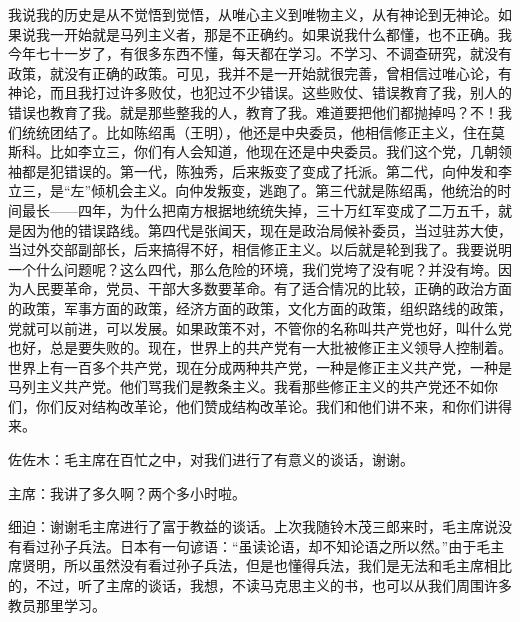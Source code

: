 我说我的历史是从不觉悟到觉悟，从唯心主义到唯物主义，从有神论到无神论。如果说我一开始就是马列主义者，那是不正确约。如果说我什么都懂，也不正确。我今年七十一岁了，有很多东西不懂，每天都在学习。不学习、不调查研究，就没有政策，就没有正确的政策。可见，我并不是一开始就很完善，曾相信过唯心论，有神论，而且我打过许多败仗，也犯过不少错误。这些败仗、错误教育了我，别人的错误也教育了我。就是那些整我的人，教育了我。难道要把他们都抛掉吗？不！我们统统团结了。比如陈绍禹（王明），他还是中央委员，他相信修正主义，住在莫斯科。比如李立三，你们有人会知道，他现在还是中央委员。我们这个党，几朝领袖都是犯错误的。第一代，陈独秀，后来叛变了变成了托派。第二代，向仲发和李立三，是“左”倾机会主义。向仲发叛变，逃跑了。第三代就是陈绍禹，他统治的时间最长——四年，为什么把南方根据地统统失掉，三十万红军变成了二万五千，就是因为他的错误路线。第四代是张闻天，现在是政治局候补委员，当过驻苏大使，当过外交部副部长，后来搞得不好，相信修正主义。以后就是轮到我了。我要说明一个什么问题呢？这么四代，那么危险的环境，我们党垮了没有呢？并没有垮。因为人民要革命，党员、干部大多数要革命。有了适合情况的比较，正确的政治方面的政策，军事方面的政策，经济方面的政策，文化方面的政策，组织路线的政策，党就可以前进，可以发展。如果政策不对，不管你的名称叫共产党也好，叫什么党也好，总是要失败的。现在，世界上的共产党有一大批被修正主义领导人控制着。世界上有一百多个共产党，现在分成两种共产党，一种是修正主义共产党，一种是马列主义共产党。他们骂我们是教条主义。我看那些修正主义的共产党还不如你们，你们反对结构改革论，他们赞成结构改革论。我们和他们讲不来，和你们讲得来。

佐佐木：毛主席在百忙之中，对我们进行了有意义的谈话，谢谢。

主席：我讲了多久啊？两个多小时啦。

细迫：谢谢毛主席进行了富于教益的谈话。上次我随铃木茂三郎来时，毛主席说没有看过孙子兵法。日本有一句谚语：“虽读论语，却不知论语之所以然。”由于毛主席贤明，所以虽然没有看过孙子兵法，但是也懂得兵法，我们是无法和毛主席相比的，不过，听了主席的谈话，我想，不读马克思主义的书，也可以从我们周围许多教员那里学习。

